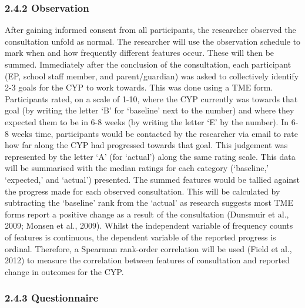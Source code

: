 \documentclass[
  english,
  man]{apa}
\begin{document}
\hypertarget{observation-1}{%
\subsubsection{2.4.2 Observation}\label{observation-1}}

After gaining informed consent from all participants, the researcher observed the consultation unfold as normal. The researcher will use the observation schedule to mark when and how frequently different features occur. These will then be summed. Immediately after the conclusion of the consultation, each participant (EP, school staff member, and parent/guardian) was asked to collectively identify 2-3 goals for the CYP to work towards. This was done using a TME form. Participants rated, on a scale of 1-10, where the CYP currently was towards that goal (by writing the letter `B' for `baseline' next to the number) and where they expected them to be in 6-8 weeks (by writing the letter `E' by the number). In 6-8 weeks time, participants would be contacted by the researcher via email to rate how far along the CYP had progressed towards that goal. This judgement was represented by the letter `A' (for `actual') along the same rating scale. This data will be summarised with the median ratings for each category (`baseline,' `expected,' and `actual') presented. The summed features would be tallied against the progress made for each observed consultation. This will be calculated by subtracting the `baseline' rank from the `actual' as research suggests most TME forms report a positive change as a result of the consultation (Dunsmuir et al., 2009; Monsen et al., 2009). Whilst the independent variable of frequency counts of features is continuous, the dependent variable of the reported progress is ordinal. Therefore, a Spearman rank-order correlation will be used (Field et al., 2012) to measure the correlation between features of consultation and reported change in outcomes for the CYP.

\hypertarget{questionnaire-1}{%
\subsubsection{2.4.3 Questionnaire}\label{questionnaire-1}}
\end{document}
